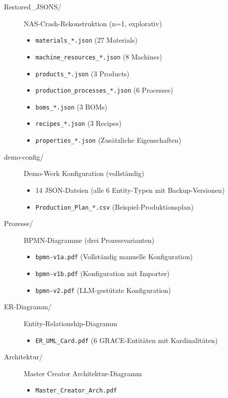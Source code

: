 \begin{description}
\item[Restored\_JSONS/] NAS-Crash-Rekonstruktion (n=1, explorativ)
\begin{itemize}
    \item \texttt{materials\_*.json} (27 Materials)
    \item \texttt{machine\_resources\_*.json} (8 Machines)
    \item \texttt{products\_*.json} (3 Products)
    \item \texttt{production\_processes\_*.json} (6 Processes)
    \item \texttt{boms\_*.json} (3 BOMs)
    \item \texttt{recipes\_*.json} (3 Recipes)
    \item \texttt{properties\_*.json} (Zusätzliche Eigenschaften)
\end{itemize}

\item[demo-config/] Demo-Werk Konfiguration (vollständig)
\begin{itemize}
    \item 14 JSON-Dateien (alle 6 Entity-Typen mit Backup-Versionen)
    \item \texttt{Production\_Plan\_*.csv} (Beispiel-Produktionsplan)
\end{itemize}

\item[Prozesse/] BPMN-Diagramme (drei Prozessvarianten)
\begin{itemize}
    \item \texttt{bpmn-v1a.pdf} (Vollständig manuelle Konfiguration)
    \item \texttt{bpmn-v1b.pdf} (Konfiguration mit Importer)
    \item \texttt{bpmn-v2.pdf} (LLM-gestützte Konfiguration)
\end{itemize}

\item[ER-Diagramm/] Entity-Relationship-Diagramm
\begin{itemize}
    \item \texttt{ER\_UML\_Card.pdf} (6 GRACE-Entitäten mit Kardinalitäten)
\end{itemize}

\item[Architektur/] Master Creator Architektur-Diagramm
\begin{itemize}
    \item \texttt{Master\_Creator\_Arch.pdf}
\end{itemize}


\end{description}

